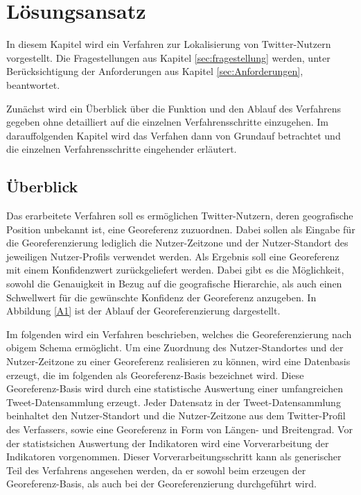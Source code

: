 \chapter{Lösungsansatz} \label{chp:Loesungsansatz}
In diesem Kapitel wird ein Verfahren zur Lokalisierung von Twitter-Nutzern vorgestellt.
Die Fragestellungen aus Kapitel \ref{sec:fragestellung} werden, unter Berücksichtigung der Anforderungen aus Kapitel \ref{sec:Anforderungen}, beantwortet.  

Zunächst wird ein Überblick über die Funktion und den Ablauf des Verfahrens gegeben ohne detailliert auf die einzelnen Verfahrensschritte einzugehen.
Im darauffolgenden Kapitel wird das Verfahen dann von Grundauf betrachtet und die einzelnen Verfahrensschritte eingehender erläutert. 


	\section{Überblick}
	Das erarbeitete Verfahren soll es ermöglichen Twitter-Nutzern, deren geografische Position unbekannt ist, eine Georeferenz zuzuordnen.
	Dabei sollen als Eingabe für die Georeferenzierung lediglich die Nutzer-Zeitzone und der Nutzer-Standort des jeweiligen Nutzer-Profils verwendet werden.
	Als Ergebnis soll eine Georeferenz mit einem Konfidenzwert zurückgeliefert werden. 
	Dabei gibt es die Möglichkeit, sowohl die Genauigkeit in Bezug auf die geografische Hierarchie, als auch einen Schwellwert für die gewünschte Konfidenz der Georeferenz anzugeben.
	In Abbildung \ref{A1} ist der Ablauf der Georeferenzierung dargestellt. 
	
	\label{A1} 

	Im folgenden wird ein Verfahren beschrieben, welches die Georeferenzierung nach obigem Schema ermöglicht. 
	Um eine Zuordnung des Nutzer-Standortes und der Nutzer-Zeitzone zu einer Georeferenz realisieren zu können, wird eine Datenbasis erzeugt, die im folgenden als Georeferenz-Basis bezeichnet wird.
	Diese Georeferenz-Basis wird durch eine statistische Auswertung einer umfangreichen Tweet-Datensammlung erzeugt. 
	Jeder Datensatz in der Tweet-Datensammlung beinhaltet den Nutzer-Standort und die Nutzer-Zeitzone aus dem Twitter-Profil des Verfassers, sowie eine Georeferenz in Form von Längen- und Breitengrad.
	Vor der statistsichen Auswertung der Indikatoren wird eine Vorverarbeitung der Indikatoren vorgenommen. 
	Dieser Vorverarbeitungsschritt kann als generischer Teil des Verfahrens angesehen werden, da er sowohl beim erzeugen der Georeferenz-Basis, als auch bei der Georeferenzierung durchgeführt wird. 
	
